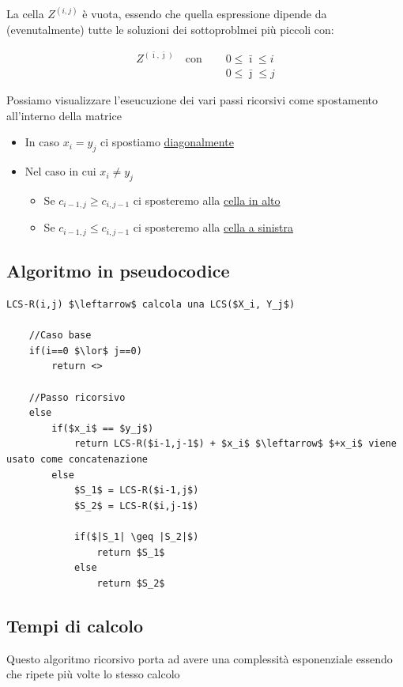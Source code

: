 La cella $Z^{(i,j)}$ è vuota, essendo che quella espressione dipende da (evenutalmente) tutte le soluzioni dei sottoproblmei più piccoli con:
{
    \large

    \begin{align*}
        Z^{(\bar{\imath}, \bar{\jmath})} \quad \text{con } & \quad 0 \leq \bar{\imath} \leq i \\
        & \quad 0 \leq \bar{\jmath} \leq j
    \end{align*}

}

Possiamo visualizzare l'eseucuzione dei vari passi ricorsivi come spostamento all'interno della matrice

\begin{itemize}
    \item In caso $x_i = y_j$ ci spostiamo \uline{diagonalmente}
    \item Nel caso in cui $x_i \not = y_j$
        \begin{itemize}
            \item [\textbf{(a)}] Se $c_{i-1,j} \geq c_{i,j-1}$ ci sposteremo alla \uline{cella in alto}
            \item [\textbf{(b)}] Se $c_{i-1,j} \leq c_{i,j-1}$ ci sposteremo alla \uline{cella a sinistra}
        \end{itemize}
\end{itemize}

\subsection{Algoritmo in pseudocodice}
\begin{lstlisting}[mathescape=true]
    LCS-R(i,j) $\leftarrow$ calcola una LCS($X_i, Y_j$)

    //Caso base
    if(i==0 $\lor$ j==0)
        return <>
    
    //Passo ricorsivo
    else
        if($x_i$ == $y_j$)
            return LCS-R($i-1,j-1$) + $x_i$ $\leftarrow$ $+x_i$ viene usato come concatenazione
        else
            $S_1$ = LCS-R($i-1,j$)
            $S_2$ = LCS-R($i,j-1$)

            if($|S_1| \geq |S_2|$)
                return $S_1$
            else
                return $S_2$
\end{lstlisting}

\subsection{Tempi di calcolo}
Questo algoritmo ricorsivo porta ad avere una complessità esponenziale essendo che ripete più volte lo stesso calcolo


